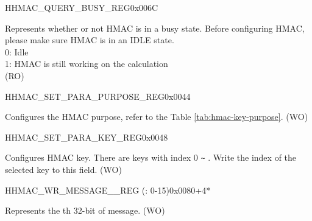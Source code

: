 \begin{register}{H}{HMAC\_QUERY\_BUSY\_REG}{0x006C}\label{regdesc:HMACQUERYBUSYREG}
%
%
\regnewline%
\begin{regdesc}\begin{reglist}
\label{fielddesc:HMACBUSYSTATE}\item [HMAC\_BUSY\_STATE] Represents whether or not HMAC is in a busy state. Before configuring HMAC, please make sure HMAC is in an IDLE state.
\\0: Idle
\\1: HMAC is still working on the calculation
\\(RO)
\end{reglist}\end{regdesc}
\end{register}


\begin{register}{H}{HMAC\_SET\_PARA\_PURPOSE\_REG}{0x0044}\label{regdesc:HMACSETPARAPURPOSEREG}
%
%
\regnewline%
\begin{regdesc}\begin{reglist}
\label{fielddesc:HMACPURPOSESET}\item [HMAC\_PURPOSE\_SET] Configures the HMAC purpose, refer to the Table \ref{tab:hmac-key-purpose}. (WO)
\end{reglist}\end{regdesc}
\end{register}


\begin{register}{H}{HMAC\_SET\_PARA\_KEY\_REG}{0x0048}\label{regdesc:HMACSETPARAKEYREG}
%
%
\regnewline%
\begin{regdesc}\begin{reglist}
\label{fielddesc:HMACKEYSET}\item [HMAC\_KEY\_SET] Configures HMAC key. There are  keys with index 0 \verb+~+ . Write the index of the selected key to this field. (WO)
\end{reglist}\end{regdesc}
\end{register}


\begin{register}{H}{HMAC\_WR\_MESSAGE\_\_REG (: 0-15)}{0x0080+4*}\label{regdesc:HMACWRMESSAGENREG}
%
\regnewline%
\begin{regdesc}\begin{reglist}
\label{fielddesc:HMACWDATAN}\item [HMAC\_WDATA\_\regindex{n}] Represents the th 32-bit of message. (WO)
\end{reglist}\end{regdesc}
\end{register}


